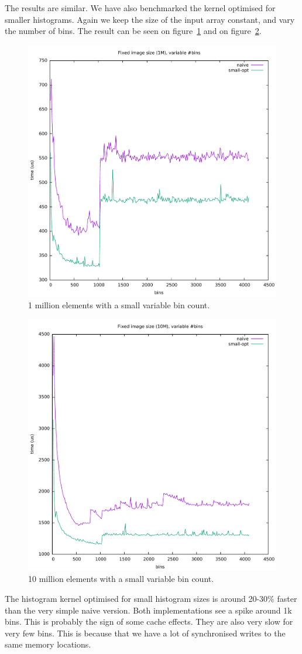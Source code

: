 \documentclass[12pt, a4paper, hidelinks]{article}
\begin{document}
The results are similar.
We have also benchmarked the kernel optimised for smaller histograms. Again we keep the size of the input array constant, and vary the number of bins. The result can be seen on figure~\ref{fig:graph3} and on figure~\ref{fig:graph4}.

\begin{figure}[htpb]
    \centering
    \includegraphics[width=0.6\linewidth]{img/graphs/1M-smallvarbins.pdf}
    \caption{1 million elements with a small variable bin count.}
    \label{fig:graph3}
\end{figure}
\begin{figure}[htpb]
    \centering
    \includegraphics[width=0.6\linewidth]{img/graphs/10M-smallvarbins.pdf}
    \caption{10 million elements with a small variable bin count.}
    \label{fig:graph4}
\end{figure}

The histogram kernel optimised for small histogram sizes is around
20-30\% faster than the very simple naive version. Both implementations see a spike
around 1k bins.
This is probably the sign of some cache effects. They are also very slow for very few bins.
This is because that we have a lot of synchronised writes to the same memory locations.
\end{document}
